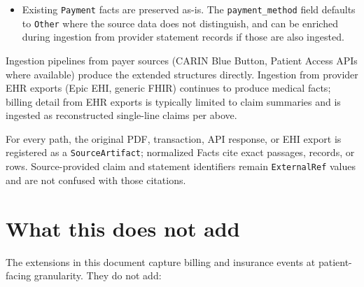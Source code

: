 \documentclass[11pt]{article}
\begin{document}
\begin{itemize}
\item Existing \texttt{Payment} facts are preserved as-is. The
\texttt{payment\_method} field defaults to \texttt{Other} where the
source data does not distinguish, and can be enriched during ingestion
from provider statement records if those are also ingested.

\end{itemize}

Ingestion pipelines from payer sources (CARIN Blue Button, Patient
Access APIs where available) produce the extended structures directly.
Ingestion from provider EHR exports (Epic EHI, generic FHIR) continues
to produce medical facts; billing detail from EHR exports is typically
limited to claim summaries and is ingested as reconstructed
single-line claims per above.

For every path, the original PDF, transaction, API response, or EHI export is
registered as a \texttt{SourceArtifact}; normalized Facts cite exact passages,
records, or rows. Source-provided claim and statement identifiers remain
\texttt{ExternalRef} values and are not confused with those citations.

\section{What this does not add}
\label{sec:what-not-added}

The extensions in this document capture billing and insurance events at
patient-facing granularity. They do not add:
\end{document}
